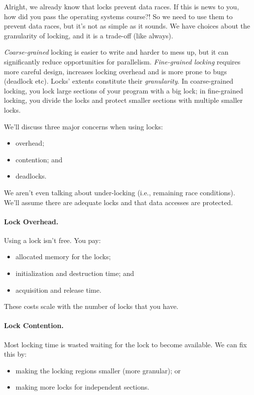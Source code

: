 Alright, we already know that locks prevent data races. If this is news to you, how did you pass the operating systems course?! So we need to use them to prevent data races, but it's not as simple as it sounds. We have choices about the granularity of locking, and it is a trade-off (like always).

\textit{Coarse-grained} locking is easier to write and harder to mess up, but it can significantly reduce opportunities for parallelism. \textit{
Fine-grained locking} requires more careful design,
increases locking overhead and is more prone to bugs (deadlock etc).  
Locks' extents constitute their {\it granularity}. In coarse-grained locking, you
lock large sections of your program with a big lock; in fine-grained
locking, you divide the locks and protect smaller sections with multiple smaller locks.

We'll discuss three major concerns when using locks:
  \begin{itemize}
    \item overhead;
    \item contention; and
    \item deadlocks.
  \end{itemize}
We aren't even talking about under-locking (i.e., remaining race conditions). We'll assume there are adequate locks and that data accesses are protected. 

\paragraph{Lock Overhead.}
  Using a lock isn't free. You pay:
  \begin{itemize}
    \item allocated memory for the locks;
    \item initialization and destruction time; and
    \item acquisition and release time.
  \end{itemize}
  These costs scale with the number of locks that you have.

\paragraph{Lock Contention.}
 Most locking time is wasted waiting for the lock to become available.
We can fix this by:
      \begin{itemize}
        \item making the locking regions smaller (more granular); or
        \item making more locks for independent sections.
      \end{itemize}

